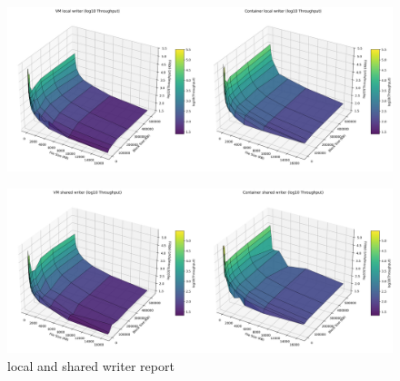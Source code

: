 \begin{figure}[H]
    \centering
    \includegraphics[width=\linewidth]{assets/VM local writer_Container local writer_log_surfaces.png}
        \end{figure}
\begin{figure}[H]
    \centering
    \includegraphics[width=\linewidth]{assets/VM shared writer_Container shared writer_log_surfaces.png}
    \caption{local and shared writer report}
    \label{fig:enter-label}
\end{figure}

